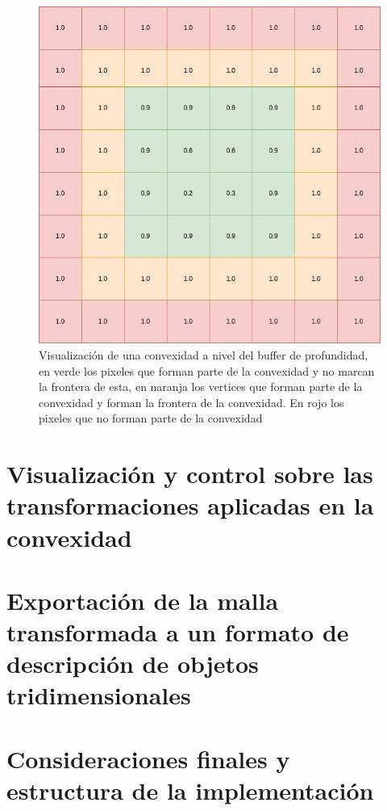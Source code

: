 \begin{figure}
\centering
\includegraphics[scale=0.5]{imagenes/Convexidad_buffer.png}
\caption[Visualización de una convexidad a nivel del buffer de profundidad]{Visualización de una convexidad a nivel del buffer de profundidad, en verde los pixeles que forman parte de la convexidad y no marcan la frontera de esta, en naranja los vertices que forman parte de la convexidad y forman la frontera de la convexidad. En rojo los pixeles que no forman parte de la convexidad}

\end{figure}

\section{Visualización y control sobre las transformaciones aplicadas en la convexidad}

\section{Exportación de la malla transformada a un formato de descripción de objetos tridimensionales}

\section{Consideraciones finales y estructura de la implementación}


